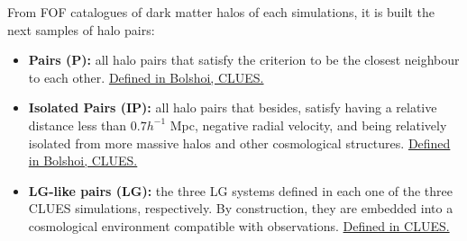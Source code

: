 \documentclass[8pt,fleqn]{beamer}
\begin{document}
\begin{frame}
\begin{tcolorbox}[colback=white!5,colframe=black!75!black,title=Defining the Samples]\justifying

	From FOF catalogues of dark matter halos of each simulations, it is built
	the next samples of halo pairs:

	\begin{small}	
	\begin{itemize}
	\justifying
	\color{black}
	\item \textbf{Pairs (P):} all halo pairs that satisfy the criterion to be 
	the closest neighbour to each other. \underline{Defined in Bolshoi, CLUES.}
	\item \textbf{Isolated Pairs (IP):} all halo pairs that besides, satisfy
	having a relative distance less than $0.7h^{-1}$ Mpc, negative radial 
	velocity, and being relatively isolated from more massive halos and other 
	cosmological structures. \underline{Defined in Bolshoi, CLUES.}
	\item \textbf{LG-like pairs (LG):} the three LG systems defined in each one
	of the three CLUES simulations, respectively. By construction, they are 
	embedded into a cosmological environment compatible with observations. 
	\underline{Defined in CLUES.}
	\end{itemize}
	\end{small}

\end{tcolorbox}
\end{frame}
\end{document}
